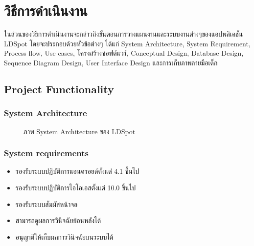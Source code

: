\documentclass[12pt,oneside,openright,a4paper]{cpe-thai-project}
\begin{document}
\chapter{วิธีการดำเนินงาน}
ในส่วนของวิธีการดำเนินงานจะกล่าวถึงขั้นตอนการวางแผนงานและระบบงานต่างๆของแอปพลิเคชัน LDSpot โดยจะประกอบด้วยหัวข้อต่างๆ ได้แก่ System Architecture, System Requirement, Process flow, Use cases, โครงสร้างซอฟต์แวร์, Conceptual Design, Database Design, Sequence Diagram Design, User Interface Design และการเก็บภาพลายมือเด็ก
\section{Project Functionality}
\subsection{System Architecture}
\begin{figure}[!ht]\centering
  \setlength{\fboxrule}{0.2mm} %
  \setlength{\fboxsep}{1cm}
  \caption{ภาพ System Architecture ของ LDSpot}\label{fig:system}
\end{figure}
\subsection{System requirements}
\begin{itemize}
  \item รองรับระบบปฏิบัติการแอนดรอยด์ตั้งแต่ 4.1 ขึ้นไป
  \item รองรับระบบปฏิบัติการไอโอเอสตั้งแต่ 10.0 ขึ้นไป
  \item รองรับระบบสัมผัสหน้าจอ
  \item สามารถดูผลการวินิจฉัยย้อนหลังได้
  \item อนุญาติให้เก็บผลการวินิจฉัยบนระบบได้
\end{itemize}
\newpage
\end{document}
